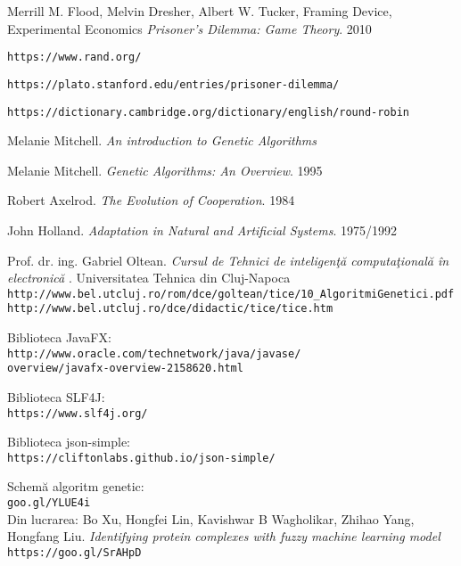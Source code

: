 \begin{thebibliography}{99}
	
Merrill M. Flood, Melvin Dresher, Albert W. Tucker, Framing Device, Experimental Economics
\textit{Prisoner's Dilemma: Game Theory}. 2010

\texttt{https://www.rand.org/}

\texttt{https://plato.stanford.edu/entries/prisoner-dilemma/}

\texttt{https://dictionary.cambridge.org/dictionary/english/round-robin}

Melanie Mitchell.
\textit{An introduction to Genetic Algorithms}

Melanie Mitchell. 
\textit{Genetic Algorithms: An Overview}. 1995

Robert Axelrod.
\textit{The Evolution of Cooperation}. 1984

John Holland. 
\textit{Adaptation in Natural and Artificial Systems}. 1975/1992

Prof. dr. ing. Gabriel Oltean.
\textit{Cursul de Tehnici de inteligenţă computaţională în electronică}
. Universitatea Tehnica din Cluj-Napoca
\\\texttt{http://www.bel.utcluj.ro/rom/dce/goltean/tice/10\_AlgoritmiGenetici.pdf}
\\\texttt{http://www.bel.utcluj.ro/dce/didactic/tice/tice.htm}

Biblioteca JavaFX:\\
\texttt{http://www.oracle.com/technetwork/java/javase/}\\
\texttt{overview/javafx-overview-2158620.html}

Biblioteca SLF4J:\\
\texttt{https://www.slf4j.org/}

Biblioteca json-simple:\\
\texttt{https://cliftonlabs.github.io/json-simple/}

Schemă algoritm genetic:
\\\texttt{goo.gl/YLUE4i}\\
Din lucrarea: Bo Xu, Hongfei Lin, Kavishwar B Wagholikar, Zhihao Yang, Hongfang Liu. \textit{Identifying protein complexes with fuzzy machine learning model}
\\\texttt{https://goo.gl/SrAHpD} 


\end{thebibliography}
